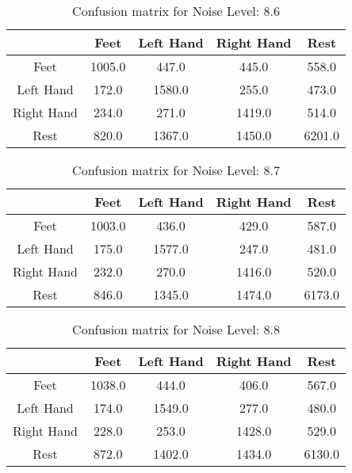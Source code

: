 \begin{table}[!htbp]
    \centering
    \begin{tabular}{|c||c|c|c|c|}
        \hline
		 & Feet & Left Hand & Right Hand & Rest \\
        \hline
        \hline
        Feet & 1005.0 & 447.0 & 445.0 & 558.0 \\
        \hline
        Left Hand & 172.0 & 1580.0 & 255.0 & 473.0 \\
        \hline
        Right Hand & 234.0 & 271.0 & 1419.0 & 514.0 \\
        \hline
        Rest & 820.0 & 1367.0 & 1450.0 & 6201.0 \\
        \hline
    \end{tabular}
    \caption{Confusion matrix for Noise Level: 8.6}
\end{table}

\begin{table}[!htbp]
    \centering
    \begin{tabular}{|c||c|c|c|c|}
        \hline
		 & Feet & Left Hand & Right Hand & Rest \\
        \hline
        \hline
        Feet & 1003.0 & 436.0 & 429.0 & 587.0 \\
        \hline
        Left Hand & 175.0 & 1577.0 & 247.0 & 481.0 \\
        \hline
        Right Hand & 232.0 & 270.0 & 1416.0 & 520.0 \\
        \hline
        Rest & 846.0 & 1345.0 & 1474.0 & 6173.0 \\
        \hline
    \end{tabular}
    \caption{Confusion matrix for Noise Level: 8.7}
\end{table}

\begin{table}[!htbp]
    \centering
    \begin{tabular}{|c||c|c|c|c|}
        \hline
		 & Feet & Left Hand & Right Hand & Rest \\
        \hline
        \hline
        Feet & 1038.0 & 444.0 & 406.0 & 567.0 \\
        \hline
        Left Hand & 174.0 & 1549.0 & 277.0 & 480.0 \\
        \hline
        Right Hand & 228.0 & 253.0 & 1428.0 & 529.0 \\
        \hline
        Rest & 872.0 & 1402.0 & 1434.0 & 6130.0 \\
        \hline
    \end{tabular}
    \caption{Confusion matrix for Noise Level: 8.8}
\end{table}

